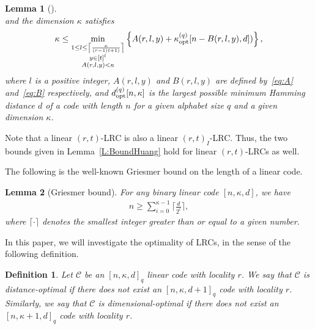 \documentclass[10pt]{article}
\newtheorem{definition}{Definition}
\newtheorem{lemma}{Lemma}
\newcommand{\0}{\textbf{0}}
\newcommand{\1}{\textbf{1}}
\begin{document}
{\begin{lemma}[\cite{HuangYUSTIT16}]
\begin{equation}
\end{equation}
and the dimension $\kappa$ satisfies
\begin{equation}\label{eq:bound-dim}
\kappa\leq \min _{\substack{1\leq l \leq \left\lceil\frac{\kappa}{(r-1)t+1)}\right\rceil\\ y \in [t]^{l} \\ A(r, l,y)<\kappa}}\left\{ A(r,l,y)+\kappa^{(q)}_{{\rm opt}}[n-B(r,l,y),d])\right\},
\end{equation}
where $l$ is a positive integer, $A(r, l, y)$ and $B(r, l, y)$ are defined by~\eqref{eq:A} and~\eqref{eq:B} respectively,
and $d_{\rm opt}^{(q)}[n, \kappa]$ is the largest possible minimum Hamming
distance $d$ of a code with length $n$ for a given alphabet size $q$
and a given dimension $\kappa$.
\end{lemma}
Note that a linear $(r, t)$-LRC is also a linear $(r, t)_I$-LRC.
Thus, the two bounds given in Lemma~\ref{L:BoundHuang} hold for linear $(r, t)$-LRCs as well.

The following is the well-known  Griesmer bound on the length of a linear code.
\begin{lemma}[Griesmer bound]\label{L:Griesmerbound}
For any binary linear code $[n, \kappa, d]$, we have
\begin{eqnarray*}
n \geq \sum_{i=0}^{\kappa-1}\bigg\lceil\frac{d}{2^i}\bigg\rceil,
\end{eqnarray*}
where $\lceil \cdot \rceil$ denotes the smallest integer greater than or equal to a given number.
\end{lemma}

In this paper, we will investigate the optimality of LRCs, in the sense of the following definition.
\begin{definition}
Let $\mathcal{C}$ be an $[n, \kappa, d]_q$ linear code with locality $r$.
We say that $\mathcal{C}$ is distance-optimal if there does not exist an $[n, \kappa, d+1]_q$ code with locality $r$.
Similarly, we say that $\mathcal{C}$  is dimensional-optimal if there does not exist an $[n, \kappa+1, d]_q$ code
with locality $r$.
\end{definition}

}
\end{document}
